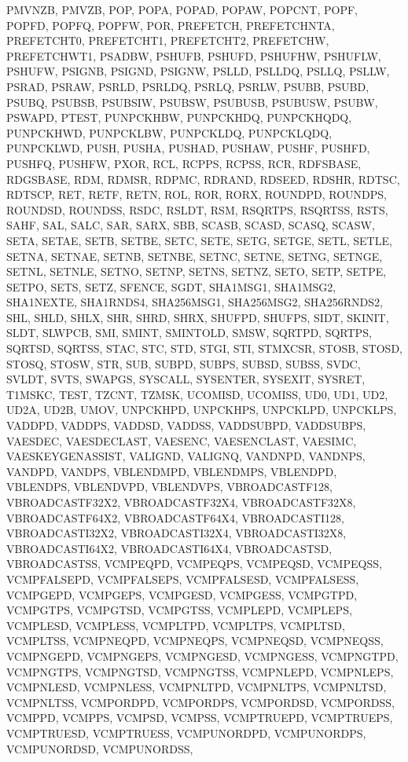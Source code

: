 {{PMVNZB, PMVZB, POP, POPA, POPAD, POPAW, POPCNT, POPF, POPFD, POPFQ, POPFW, POR,
PREFETCH, PREFETCHNTA, PREFETCHT0, PREFETCHT1, PREFETCHT2, PREFETCHW,
PREFETCHWT1, PSADBW, PSHUFB, PSHUFD, PSHUFHW, PSHUFLW, PSHUFW, PSIGNB, PSIGND,
PSIGNW, PSLLD, PSLLDQ, PSLLQ, PSLLW, PSRAD, PSRAW, PSRLD, PSRLDQ, PSRLQ, PSRLW,
PSUBB, PSUBD, PSUBQ, PSUBSB, PSUBSIW, PSUBSW, PSUBUSB, PSUBUSW, PSUBW, PSWAPD,
PTEST, PUNPCKHBW, PUNPCKHDQ, PUNPCKHQDQ, PUNPCKHWD, PUNPCKLBW, PUNPCKLDQ,
PUNPCKLQDQ, PUNPCKLWD, PUSH, PUSHA, PUSHAD, PUSHAW, PUSHF, PUSHFD, PUSHFQ,
PUSHFW, PXOR, RCL, RCPPS, RCPSS, RCR, RDFSBASE, RDGSBASE, RDM, RDMSR, RDPMC,
RDRAND, RDSEED, RDSHR, RDTSC, RDTSCP, RET, RETF, RETN, ROL, ROR, RORX, ROUNDPD,
ROUNDPS, ROUNDSD, ROUNDSS, RSDC, RSLDT, RSM, RSQRTPS, RSQRTSS, RSTS, SAHF, SAL,
SALC, SAR, SARX, SBB, SCASB, SCASD, SCASQ, SCASW, SETA, SETAE, SETB, SETBE,
SETC, SETE, SETG, SETGE, SETL, SETLE, SETNA, SETNAE, SETNB, SETNBE, SETNC,
SETNE, SETNG, SETNGE, SETNL, SETNLE, SETNO, SETNP, SETNS, SETNZ, SETO, SETP,
SETPE, SETPO, SETS, SETZ, SFENCE, SGDT, SHA1MSG1, SHA1MSG2, SHA1NEXTE,
SHA1RNDS4, SHA256MSG1, SHA256MSG2, SHA256RNDS2, SHL, SHLD, SHLX, SHR, SHRD,
SHRX, SHUFPD, SHUFPS, SIDT, SKINIT, SLDT, SLWPCB, SMI, SMINT, SMINTOLD, SMSW,
SQRTPD, SQRTPS, SQRTSD, SQRTSS, STAC, STC, STD, STGI, STI, STMXCSR, STOSB,
STOSD, STOSQ, STOSW, STR, SUB, SUBPD, SUBPS, SUBSD, SUBSS, SVDC, SVLDT, SVTS,
SWAPGS, SYSCALL, SYSENTER, SYSEXIT, SYSRET, T1MSKC, TEST, TZCNT, TZMSK, UCOMISD,
UCOMISS, UD0, UD1, UD2, UD2A, UD2B, UMOV, UNPCKHPD, UNPCKHPS, UNPCKLPD,
UNPCKLPS, VADDPD, VADDPS, VADDSD, VADDSS, VADDSUBPD, VADDSUBPS, VAESDEC,
VAESDECLAST, VAESENC, VAESENCLAST, VAESIMC, VAESKEYGENASSIST, VALIGND, VALIGNQ,
VANDNPD, VANDNPS, VANDPD, VANDPS, VBLENDMPD, VBLENDMPS, VBLENDPD, VBLENDPS,
VBLENDVPD, VBLENDVPS, VBROADCASTF128, VBROADCASTF32X2, VBROADCASTF32X4,
VBROADCASTF32X8, VBROADCASTF64X2, VBROADCASTF64X4, VBROADCASTI128,
VBROADCASTI32X2, VBROADCASTI32X4, VBROADCASTI32X8, VBROADCASTI64X2,
VBROADCASTI64X4, VBROADCASTSD, VBROADCASTSS, VCMPEQPD, VCMPEQPS, VCMPEQSD,
VCMPEQSS, VCMPFALSEPD, VCMPFALSEPS, VCMPFALSESD, VCMPFALSESS, VCMPGEPD,
VCMPGEPS, VCMPGESD, VCMPGESS, VCMPGTPD, VCMPGTPS, VCMPGTSD, VCMPGTSS, VCMPLEPD,
VCMPLEPS, VCMPLESD, VCMPLESS, VCMPLTPD, VCMPLTPS, VCMPLTSD, VCMPLTSS, VCMPNEQPD,
VCMPNEQPS, VCMPNEQSD, VCMPNEQSS, VCMPNGEPD, VCMPNGEPS, VCMPNGESD, VCMPNGESS,
VCMPNGTPD, VCMPNGTPS, VCMPNGTSD, VCMPNGTSS, VCMPNLEPD, VCMPNLEPS, VCMPNLESD,
VCMPNLESS, VCMPNLTPD, VCMPNLTPS, VCMPNLTSD, VCMPNLTSS, VCMPORDPD, VCMPORDPS,
VCMPORDSD, VCMPORDSS, VCMPPD, VCMPPS, VCMPSD, VCMPSS, VCMPTRUEPD, VCMPTRUEPS,
VCMPTRUESD, VCMPTRUESS, VCMPUNORDPD, VCMPUNORDPS, VCMPUNORDSD, VCMPUNORDSS,
}}
